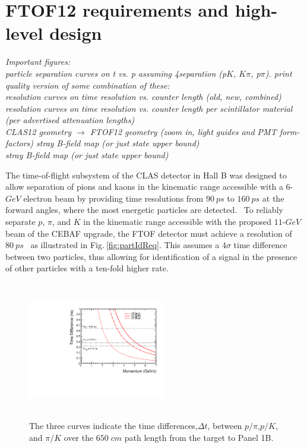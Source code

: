 \section{FTOF12 requirements and high-level design}
\label{FTOF12}


{\it Important figures:\\
particle separation curves on t vs. p assuming 4separation (p$K$, $K\pi$, p$\pi$).  print quality version of some combination of these: \\
resolution curves on time resolution vs. counter length (old, new, combined) \\
resolution curves on time resolution vs. counter length per scintillator material (per advertised attenuation lengths)\\
CLAS12 geometry $\rightarrow$ FTOF12 geometry (zoom in, light guides and PMT form-factors)
stray B-field map (or just state upper bound)\\
stray B-field map (or just state upper bound)
}

The time-of-flight subsystem of the CLAS detector in Hall B was designed to allow separation of pions and kaons in the kinematic range accessible with a $6$-$GeV$ electron beam by providing time resolutions from $90\:ps$ to $160\:ps$ at the forward angles, where the most energetic particles are detected.~\cite{clastof} To reliably separate $p$, $\pi$, and $K$ in the kinematic range accessible with the proposed $11$-$GeV$ beam of the CEBAF upgrade, the FTOF detector must achieve a resolution of $80\:ps$~\cite{tdr} as illustrated in Fig.$\:$\ref{fig:partIdReq}. This assumes a $4\sigma$ time difference between two particles, thus allowing for identification of a signal in the presence of other particles with a ten-fold higher rate.
\begin{figure}[h!]
\centerline{\includegraphics[width=6cm,height=6cm]{evan/fig_evan_ftof_requirements/DeltaT.pdf}}
\caption{The three curves indicate the time differences,$\Delta t$, between $p/\pi$,$p/K$, and $\pi/K$ over the $650\;cm$ path length from the target to Panel 1B. }
\label{fig:DeltaT}
\end{figure}

